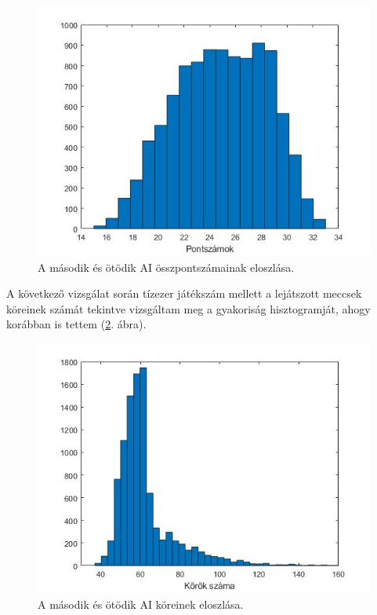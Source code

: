 \begin{figure}[h]
\centering
\includegraphics[scale=0.55]{images/final_scores_AI2vsAI5.jpg}
\caption{A második és ötödik AI összpontszámainak eloszlása.}
\label{fig:scores2v5}
\end{figure}

\newpage

A következő vizsgálat során tízezer játékszám mellett a lejátszott meccsek köreinek számát tekintve vizsgáltam meg a gyakoriság hisztogramját, ahogy korábban is tettem (\ref{fig:rounds2v5}. ábra).

\begin{figure}[h]
\centering
\includegraphics[scale=0.5]{images/round_number_hist_AI2vsAI5.jpg}
\caption{A második és ötödik AI köreinek eloszlása.}
\label{fig:rounds2v5}
\end{figure}

